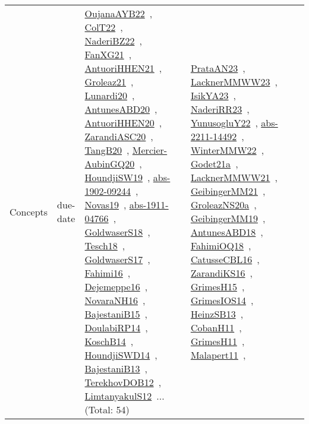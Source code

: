 {\begin{longtable}{lp{3cm}>{\raggedright\arraybackslash}p{6cm}>{\raggedright\arraybackslash}p{6cm}>{\raggedright\arraybackslash}p{8cm}}
Concepts & due-date & \href{works/OujanaAYB22.pdf}{OujanaAYB22}~\cite{OujanaAYB22}, \href{works/ColT22.pdf}{ColT22}~\cite{ColT22}, \href{works/NaderiBZ22.pdf}{NaderiBZ22}~\cite{NaderiBZ22}, \href{works/FanXG21.pdf}{FanXG21}~\cite{FanXG21}, \href{works/AntuoriHHEN21.pdf}{AntuoriHHEN21}~\cite{AntuoriHHEN21}, \href{works/Groleaz21.pdf}{Groleaz21}~\cite{Groleaz21}, \href{works/Lunardi20.pdf}{Lunardi20}~\cite{Lunardi20}, \href{works/AntunesABD20.pdf}{AntunesABD20}~\cite{AntunesABD20}, \href{works/AntuoriHHEN20.pdf}{AntuoriHHEN20}~\cite{AntuoriHHEN20}, \href{works/ZarandiASC20.pdf}{ZarandiASC20}~\cite{ZarandiASC20}, \href{works/TangB20.pdf}{TangB20}~\cite{TangB20}, \href{works/Mercier-AubinGQ20.pdf}{Mercier-AubinGQ20}~\cite{Mercier-AubinGQ20}, \href{works/HoundjiSW19.pdf}{HoundjiSW19}~\cite{HoundjiSW19}, \href{works/abs-1902-09244.pdf}{abs-1902-09244}~\cite{abs-1902-09244}, \href{works/Novas19.pdf}{Novas19}~\cite{Novas19}, \href{works/abs-1911-04766.pdf}{abs-1911-04766}~\cite{abs-1911-04766}, \href{works/GoldwaserS18.pdf}{GoldwaserS18}~\cite{GoldwaserS18}, \href{works/Tesch18.pdf}{Tesch18}~\cite{Tesch18}, \href{works/GoldwaserS17.pdf}{GoldwaserS17}~\cite{GoldwaserS17}, \href{works/Fahimi16.pdf}{Fahimi16}~\cite{Fahimi16}, \href{works/Dejemeppe16.pdf}{Dejemeppe16}~\cite{Dejemeppe16}, \href{works/NovaraNH16.pdf}{NovaraNH16}~\cite{NovaraNH16}, \href{works/BajestaniB15.pdf}{BajestaniB15}~\cite{BajestaniB15}, \href{works/DoulabiRP14.pdf}{DoulabiRP14}~\cite{DoulabiRP14}, \href{works/KoschB14.pdf}{KoschB14}~\cite{KoschB14}, \href{works/HoundjiSWD14.pdf}{HoundjiSWD14}~\cite{HoundjiSWD14}, \href{works/BajestaniB13.pdf}{BajestaniB13}~\cite{BajestaniB13}, \href{works/TerekhovDOB12.pdf}{TerekhovDOB12}~\cite{TerekhovDOB12}, \href{works/LimtanyakulS12.pdf}{LimtanyakulS12}~\cite{LimtanyakulS12}... (Total: 54) & \href{works/PrataAN23.pdf}{PrataAN23}~\cite{PrataAN23}, \href{works/LacknerMMWW23.pdf}{LacknerMMWW23}~\cite{LacknerMMWW23}, \href{works/IsikYA23.pdf}{IsikYA23}~\cite{IsikYA23}, \href{works/NaderiRR23.pdf}{NaderiRR23}~\cite{NaderiRR23}, \href{works/YunusogluY22.pdf}{YunusogluY22}~\cite{YunusogluY22}, \href{works/abs-2211-14492.pdf}{abs-2211-14492}~\cite{abs-2211-14492}, \href{works/WinterMMW22.pdf}{WinterMMW22}~\cite{WinterMMW22}, \href{works/Godet21a.pdf}{Godet21a}~\cite{Godet21a}, \href{works/LacknerMMWW21.pdf}{LacknerMMWW21}~\cite{LacknerMMWW21}, \href{works/GeibingerMM21.pdf}{GeibingerMM21}~\cite{GeibingerMM21}, \href{works/GroleazNS20a.pdf}{GroleazNS20a}~\cite{GroleazNS20a}, \href{works/GeibingerMM19.pdf}{GeibingerMM19}~\cite{GeibingerMM19}, \href{works/AntunesABD18.pdf}{AntunesABD18}~\cite{AntunesABD18}, \href{works/FahimiOQ18.pdf}{FahimiOQ18}~\cite{FahimiOQ18}, \href{works/CatusseCBL16.pdf}{CatusseCBL16}~\cite{CatusseCBL16}, \href{works/ZarandiKS16.pdf}{ZarandiKS16}~\cite{ZarandiKS16}, \href{works/GrimesH15.pdf}{GrimesH15}~\cite{GrimesH15}, \href{works/GrimesIOS14.pdf}{GrimesIOS14}~\cite{GrimesIOS14}, \href{works/HeinzSB13.pdf}{HeinzSB13}~\cite{HeinzSB13}, \href{works/CobanH11.pdf}{CobanH11}~\cite{CobanH11}, \href{works/GrimesH11.pdf}{GrimesH11}~\cite{GrimesH11}, \href{works/Malapert11.pdf}{Malapert11}~\cite{Malapert11}, 
\end{longtable}}
